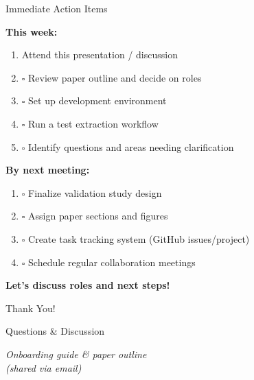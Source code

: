 \documentclass[10pt]{beamer}
\begin{document}
\begin{frame}{Immediate Action Items}

  \textbf{This week:}
  \begin{enumerate}
    \item \checkmark Attend this presentation / discussion
    \item $\square$ Review paper outline and decide on roles
    \item $\square$ Set up development environment
    \item $\square$ Run a test extraction workflow
    \item $\square$ Identify questions and areas needing clarification
  \end{enumerate}

  \vspace{0.5cm}

  \textbf{By next meeting:}
  \begin{enumerate}
    \item $\square$ Finalize validation study design
    \item $\square$ Assign paper sections and figures
    \item $\square$ Create task tracking system (GitHub issues/project)
    \item $\square$ Schedule regular collaboration meetings
  \end{enumerate}

  \vspace{0.5cm}

  \begin{center}
    \Large\textbf{Let's discuss roles and next steps!}
  \end{center}

\end{frame}

\begin{frame}[plain,c]

  \begin{center}
    \Huge Thank You!

    \vspace{1cm}

    \Large Questions \& Discussion

    \vspace{1cm}

    \normalsize
    \textit{Onboarding guide \& paper outline}\\
    \textit{(shared via email)}
  \end{center}

\end{frame}
\end{document}

